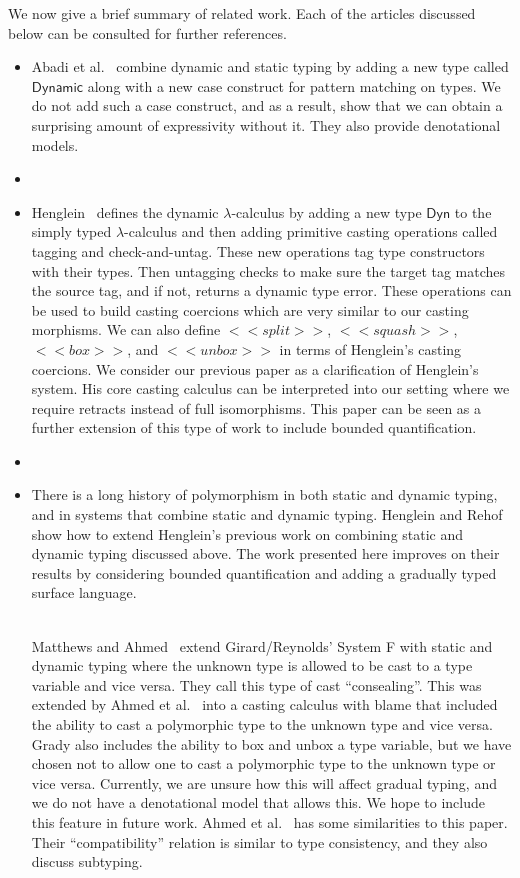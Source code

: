 We now give a brief summary of related work. Each of the articles
discussed below can be consulted for further references.
\begin{itemize}
\item Abadi et al.~\cite{Abadi:1989} combine dynamic and static typing
  by adding a new type called $\mathsf{Dynamic}$ along with a new case
  construct for pattern matching on types.  We do not add such a case
  construct, and as a result, show that we can obtain a surprising
  amount of expressivity without it.  They also provide denotational
  models.
\item[]
\item Henglein~\cite{Henglein:1994} defines the dynamic
  $\lambda$-calculus by adding a new type $\mathsf{Dyn}$ to the simply
  typed $\lambda$-calculus and then adding primitive casting
  operations called tagging and check-and-untag.  These new operations
  tag type constructors with their types.  Then untagging checks to
  make sure the target tag matches the source tag, and if not, returns
  a dynamic type error.  These operations can be used to build casting
  coercions which are very similar to our casting morphisms. We can
  also define $<<split>>$, $<<squash>>$, $<<box>>$, and $<<unbox>>$ in
  terms of Henglein's casting coercions.  We consider our previous
  paper \cite{Eades:2017} as a clarification of Henglein's system.
  His core casting calculus can be interpreted into our setting where
  we require retracts instead of full isomorphisms.  This paper can be
  seen as a further extension of this type of work to include bounded
  quantification.
\item[]
\item There is a long history of polymorphism in both static and
  dynamic typing, and in systems that combine static and dynamic
  typing. Henglein and Rehof~\cite{Henglein:1995,Rehof:1995} show how
  to extend Henglein's previous work on combining static and dynamic
  typing discussed above.  The work presented here improves on their
  results by considering bounded quantification and adding a gradually
  typed surface language.

  \ \\ Matthews and Ahmed~\cite{Matthews:2008:PPT:1792878.1792881}
  extend Girard/Reynolds' System F with static and dynamic typing
  where the unknown type is allowed to be cast to a type variable and
  vice versa.  They call this type of cast ``consealing''.  This was
  extended by Ahmed et al.~\cite{Ahmed:2011:BLA:1926385.1926409} into
  a casting calculus with blame that included the ability to cast a
  polymorphic type to the unknown type and vice versa.  Grady also
  includes the ability to box and unbox a type variable, but we have
  chosen not to allow one to cast a polymorphic type to the unknown
  type or vice versa. Currently, we are unsure how this will affect
  gradual typing, and we do not have a denotational model that allows
  this.  We hope to include this feature in future work.  Ahmed et
  al.~\cite{Ahmed:2011:BLA:1926385.1926409} has some similarities to
  this paper.  Their ``compatibility'' relation is similar to type
  consistency, and they also discuss subtyping.


\end{itemize}

